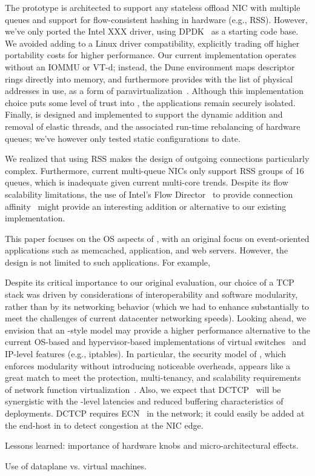  


 The \ix prototype is
architected to support any stateless offload NIC with multiple queues
and support for flow-consistent hashing in hardware (e.g., RSS).
However, we've only ported the Intel XXX driver, using
DPDK~\cite{intel:dpdk} as a starting code base.  We avoided adding to
\ix a Linux driver compatibility, explicitly trading off higher
portability costs for higher performance.  Our current implementation
operates without an IOMMU or VT-d; instead, the Dune environment maps
descriptor rings directly into \ix memory, and furthermore provides
\ix with the list of physical addresses in use, as a form of
paravirtualization~\cite{DBLP:conf/sosp/BarhamDFHHHN03}.  Although
this implementation choice puts some level of trust into \ix, the
applications remain securely isolated.  Finally, \ix is designed and
implemented to support the dynamic addition and removal of elastic
threads, and the associated run-time rebalancing of hardware queues;
we've however only tested static configurations to date. 

 We realized that using RSS
makes the design of outgoing connections particularly complex.
Furthermore, current multi-queue NICs only support RSS groups of 16
queues, which is inadequate given current multi-core trends.  Despite
its flow scalability limitations, the use of Intel's Flow
Director~\cite{intel:82599} to provide connection
affinity~\cite{DBLP:conf/eurosys/PesterevSZM12} might provide an
interesting addition or alternative to our existing implementation.


 This paper focuses on the
OS aspects of \ix, with an original focus on event-oriented
applications such as memcached, application, and web servers.
However, the \ix design is not limited to such applications.  For
example, 

Despite its critical importance to our original evaluation, our choice
of a TCP stack was driven by considerations of interoperability and
software modularity, rather than by its networking behavior (which we
had to enhance substantially to meet the challenges of current
datacenter networking speeds).  Looking ahead, we envision that an
\ix-style model may provide a higher performance alternative to the
current OS-based and hypervisor-based implementations of virtual
switches~\cite{openvswitch} and IP-level features (e.g., iptables).
In particular, the security model of \ix, which enforces modularity
without introducing noticeable overheads, appears like a great match
to meet the protection, multi-tenancy, and scalability requirements of
network function virtualization~\cite{etsi:NFV}.  Also, we expect that
DCTCP~\cite{DBLP:conf/sigcomm/AlizadehGMPPPSS10} will be synergistic
with the \microsecond-level latencies and reduced buffering
characteristics of \ix deployments.  DCTCP requires
ECN~\cite{ramakrishnan2001addition} in the network; it could easily be
added at the end-host in \ix to detect congestion at the NIC edge.




\todo Lessons learned: importance of hardware knobs and micro-architectural effects.


\todo Use of dataplane vs. virtual machines. 

